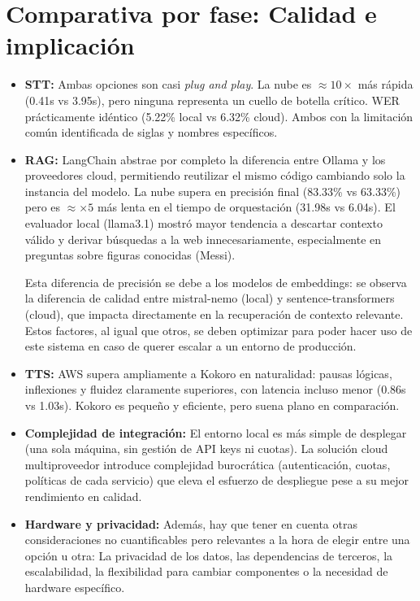 \documentclass[11pt,spanish,listoffigures,listoftables]{tfgetsinf}
\begin{document}
\section{Comparativa por fase: Calidad e implicación}


\begin{itemize}
    \item \textbf{STT:} Ambas opciones son casi \textit{plug and play}. La nube es $\approx10 \times$ más rápida (0.41s vs 3.95s), pero ninguna representa un cuello de botella crítico. WER prácticamente idéntico (5.22\% local vs 6.32\% cloud). Ambos con la limitación común identificada de siglas y nombres específicos.
    
    \item \textbf{RAG:} LangChain abstrae por completo la diferencia entre Ollama y los proveedores cloud, permitiendo reutilizar el mismo código cambiando solo la instancia del modelo. La nube supera en precisión final (83.33\% vs 63.33\%) pero es $\approx \times 5$ más lenta en el tiempo de orquestación (31.98s vs 6.04s). El evaluador local (llama3.1) mostró mayor tendencia a descartar contexto válido y derivar búsquedas a la web innecesariamente, especialmente en preguntas sobre figuras conocidas (Messi). 
    
    Esta diferencia de precisión se debe a los modelos de embeddings: se observa la diferencia de calidad entre mistral-nemo (local) y sentence-transformers (cloud), que impacta directamente en la recuperación de contexto relevante. Estos factores, al igual que otros, se deben optimizar para poder hacer uso de este sistema en caso de querer escalar a un entorno de producción.
    
    \item \textbf{TTS:} AWS supera ampliamente a Kokoro en naturalidad: pausas lógicas, inflexiones y fluidez claramente superiores, con latencia incluso menor (0.86s vs 1.03s). Kokoro es pequeño y eficiente, pero suena plano en comparación.
    
    \item \textbf{Complejidad de integración:} El entorno local es más simple de desplegar (una sola máquina, sin gestión de API keys ni cuotas). La solución cloud multiproveedor introduce complejidad burocrática (autenticación, cuotas, políticas de cada servicio) que eleva el esfuerzo de despliegue pese a su mejor rendimiento en calidad.
    
    \item \textbf{Hardware y privacidad:} 
    Además, hay que tener en cuenta otras consideraciones no cuantificables pero relevantes a la hora de elegir entre una opción u otra: La privacidad de los datos, las dependencias de terceros, la escalabilidad, la flexibilidad para cambiar componentes o la necesidad de hardware específico. 
    

\end{itemize}
\end{document}
